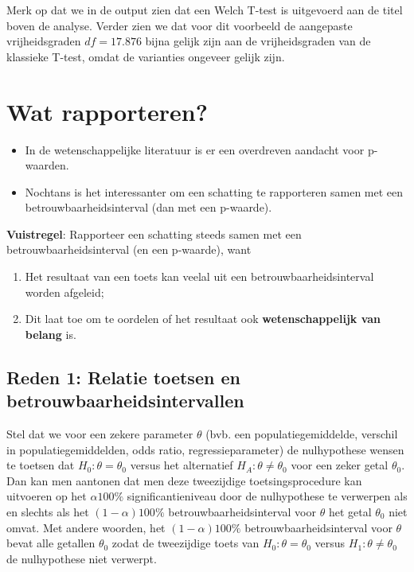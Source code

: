 \documentclass[
  12pt,dutch,coursenotes]{book}
\providecommand{\tightlist}{%
  \setlength{\itemsep}{0pt}\setlength{\parskip}{0pt}}
\begin{document}
Merk op dat we in de output zien dat een Welch T-test is uitgevoerd aan de titel boven de analyse.
Verder zien we dat voor dit voorbeeld de aangepaste vrijheidsgraden \(df = 17.876\) bijna gelijk zijn aan de vrijheidsgraden van de klassieke T-test, omdat de varianties ongeveer gelijk zijn.

\hypertarget{wat-rapporteren-1}{%
\section{Wat rapporteren?}\label{wat-rapporteren-1}}

\begin{itemize}
\tightlist
\item
  In de wetenschappelijke literatuur is er een overdreven aandacht voor p-waarden.
\item
  Nochtans is het interessanter om een schatting te rapporteren samen met een betrouwbaarheidsinterval (dan met een p-waarde).
\end{itemize}

\textbf{Vuistregel}:
Rapporteer een schatting steeds samen met een betrouwbaarheidsinterval (en een p-waarde), want

\begin{enumerate}
\def\labelenumi{\arabic{enumi}.}
\tightlist
\item
  Het resultaat van een toets kan veelal uit een betrouwbaarheidsinterval worden afgeleid;
\item
  Dit laat toe om te oordelen of het resultaat ook \textbf{wetenschappelijk van belang} is.
\end{enumerate}

\hypertarget{reden-1-relatie-toetsen-en-betrouwbaarheidsintervallen}{%
\subsection{Reden 1: Relatie toetsen en betrouwbaarheidsintervallen}\label{reden-1-relatie-toetsen-en-betrouwbaarheidsintervallen}}

Stel dat we voor een zekere parameter \(\theta\) (bvb. een
populatiegemiddelde, verschil in populatiegemiddelden, odds ratio,
regressieparameter) de nulhypothese wensen te toetsen dat \(H_0 : \theta= \theta_0\) versus het alternatief \(H_A : \theta \neq \theta_0\) voor een zeker
getal \(\theta_0\). Dan kan men aantonen dat men deze tweezijdige
toetsingsprocedure kan uitvoeren op het \(\alpha 100\%\) significantieniveau
door de nulhypothese te verwerpen als en slechts als het \((1-\alpha)100\%\)
betrouwbaarheidsinterval voor \(\theta\) het getal \(\theta_0\) niet omvat. Met
andere woorden, het \((1-\alpha)100\%\) betrouwbaarheidsinterval voor \(\theta\)
bevat alle getallen \(\theta_0\) zodat de tweezijdige toets van \(H_0 : \theta= \theta_0\) versus \(H_1 : \theta \neq \theta_0\) de nulhypothese niet verwerpt.
\end{document}
